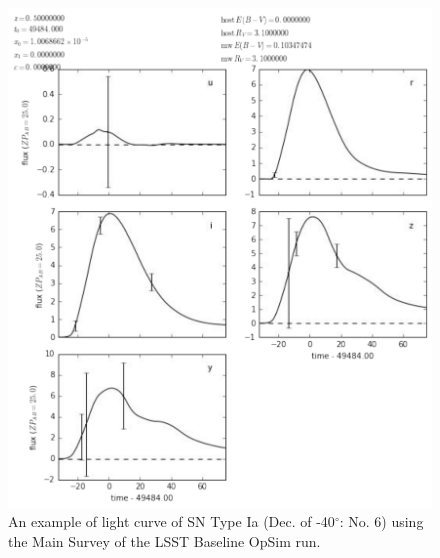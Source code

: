 

 
\begin{figure}[tbh!]
\includegraphics[angle=0,width=0.99\hsize:,clip]{figs/supernova/LCDecminus40no40.pdf}
\caption{An example of light curve of SN Type Ia (Dec. of -40$^{\circ}$: No. 6) using 
the Main Survey of the LSST Baseline OpSim run. }
\label{fig:SNIaLCminus40}
\end{figure}

